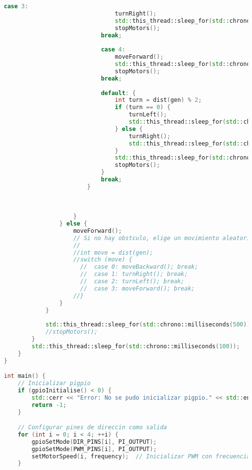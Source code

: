 \begin{lstlisting}[language={C++}, caption={Primer ajuste de c\'odigo}, label={Script}]
                            case 3:
                                turnRight();
                                std::this_thread::sleep_for(std::chrono::seconds(7));
                                stopMotors();
                            break;
                            
                            case 4:
                                moveForward();
                                std::this_thread::sleep_for(std::chrono::seconds(2));
                                stopMotors();
                            break;
                            
                            default: {
                                int turn = dist(gen) % 2;
                                if (turn == 0) {
                                    turnLeft();
                                    std::this_thread::sleep_for(std::chrono::seconds(5));
                                } else {
                                    turnRight();
                                    std::this_thread::sleep_for(std::chrono::seconds(5));
                                }
                                std::this_thread::sleep_for(std::chrono::seconds(2));
                                stopMotors();
                            }
                            break;
                        }

                        
                        
                    }
                } else {
                    moveForward();
                    // Si no hay obstculo, elige un movimiento aleatorio
                    //
                    //int move = dist(gen);
                    //switch (move) {
                      //  case 0: moveBackward(); break;
                      //  case 1: turnRight(); break;
                      //  case 2: turnLeft(); break;
                      //  case 3: moveForward(); break;
                    //}
                }
            }
            
            std::this_thread::sleep_for(std::chrono::milliseconds(500));
            //stopMotors();
        }
        std::this_thread::sleep_for(std::chrono::milliseconds(100));
    }
}

int main() {
    // Inicializar pigpio
    if (gpioInitialise() < 0) {
        std::cerr << "Error: No se pudo inicializar pigpio." << std::endl;
        return -1;
    }

    // Configurar pines de direccin como salida
    for (int i = 0; i < 4; ++i) {
        gpioSetMode(DIR_PINS[i], PI_OUTPUT);
        gpioSetMode(PWM_PINS[i], PI_OUTPUT);
        setMotorSpeed(i, frequency);  // Inicializar PWM con frecuencia inicial
    }


\end{lstlisting}
